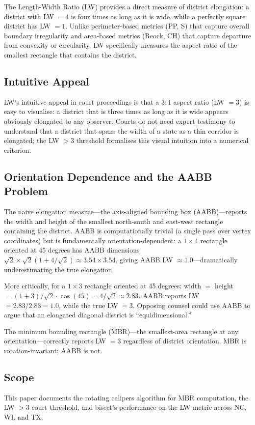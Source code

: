 The Length-Width Ratio (LW) provides a direct measure of district elongation:
a district with LW $= 4$ is four times as long as it is wide,
while a perfectly square district has LW $= 1$.
Unlike perimeter-based metrics (PP, S) that capture overall boundary irregularity
and area-based metrics (Reock, CH) that capture departure from convexity or
circularity, LW specifically measures the aspect ratio of the smallest rectangle
that contains the district.

\subsection{Intuitive Appeal}

LW's intuitive appeal in court proceedings is that a $3:1$ aspect ratio
(LW $= 3$) is easy to visualise: a district that is three times as long as
it is wide appears obviously elongated to any observer.
Courts do not need expert testimony to understand that a district that spans
the width of a state as a thin corridor is elongated; the LW $> 3$ threshold
formalises this visual intuition into a numerical criterion.

\subsection{Orientation Dependence and the AABB Problem}

The naive elongation measure---the axis-aligned bounding box (AABB)---reports
the width and height of the smallest north-south and east-west rectangle
containing the district.
AABB is computationally trivial (a single pass over vertex coordinates) but
is fundamentally orientation-dependent: a $1 \times 4$ rectangle oriented
at 45 degrees has AABB dimensions $\sqrt{2} \times \sqrt{2}(1 + 4/\sqrt{2}) \approx 3.54 \times 3.54$,
giving AABB LW $\approx 1.0$---dramatically underestimating the true elongation.

More critically, for a $1 \times 3$ rectangle oriented at 45 degrees:
width $= $ height $= (1 + 3)/\sqrt{2} \cdot \cos(45) = 4/\sqrt{2} \approx 2.83$.
AABB reports LW $= 2.83 / 2.83 = 1.0$, while the true LW $= 3$.
Opposing counsel could use AABB to argue that an elongated diagonal district
is ``equidimensional.''

The minimum bounding rectangle (MBR)---the smallest-area rectangle at any
orientation---correctly reports LW $= 3$ regardless of district orientation.
MBR is rotation-invariant; AABB is not.

\subsection{Scope}

This paper documents the rotating calipers algorithm for MBR computation,
the LW $> 3$ court threshold, and bisect's performance on the LW metric
across NC, WI, and TX.
